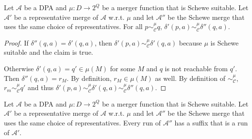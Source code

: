\begin{lem}
	Let $\mathcal{A}$ be a DPA and $\mu : D \rightarrow 2^Q$ be a merger function that is Schewe suitable. Let $\mathcal{A}'$ be a representative merge of $\mathcal{A}$ w.r.t. $\mu$ and let $\mathcal{A}''$ be the Schewe merge that uses the same choice of representatives. For all $p \sim_\mathcal{C}^\mu q$, $\delta'(p, a) \sim_\mathcal{C}^\mu \delta''(q, a)$.
	\label{lem:schewe:different_merges_still_congruent}
\end{lem}

\begin{proof}
	If $\delta''(q, a) = \delta'(q, a)$, then $\delta'(p, a) \sim_\mathcal{C}^\mu \delta'(q, a)$ because $\mu$ is Schewe suitable and the claim is true.
	
	Otherwise $\delta'(q, a) = q' \in \mu(M)$ for some $M$ and $q$ is not reachable from $q'$. Then $\delta''(q, a) = r_M$. By definition, $r_M \in \mu(M)$ as well. By definition of $\sim_\mathcal{C}^\mu$, $r_m \sim_\mathcal{C}^\mu q'$ and thus $\delta'(p, a) \sim_\mathcal{C}^\mu \delta'(q, a) \sim_\mathcal{C}^\mu \delta''(q, a)$.
\end{proof}


\begin{lem}
	Let $\mathcal{A}$ be a DPA and $\mu : D \rightarrow 2^Q$ be a merger function that is Schewe suitable. Let $\mathcal{A}'$ be a representative merge of $\mathcal{A}$ w.r.t. $\mu$ and let $\mathcal{A}''$ be the Schewe merge that uses the same choice of representatives. Every run of $\mathcal{A}''$ has a suffix that is a run of $\mathcal{A}'$.
	\label{lem:schewe:merge_has_suffix_run}
\end{lem}

